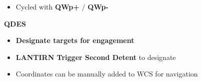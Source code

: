 \documentclass[fontSpartan]{TechCheck}
\begin{document}
\begin{longtableitemize}
{\begin{subitemize}
\begin{itemize}
				\item Cycled with \textbf{QWp+} / \textbf{QWp-}
			\end{itemize}
			\item \textbf{QDES}
			\begin{itemize}
				\item \textbf{Designate targets for engagement}
				\item \textbf{LANTIRN Trigger Second Detent} to designate
				\item Coordinates can be manually added to WCS for navigation
			\end{itemize}
		\end{subitemize}}
	\end{longtableitemize}

	\clearpage

	\hypertarget{subsec:lantirnlasingdesignation}{}
\end{document}
